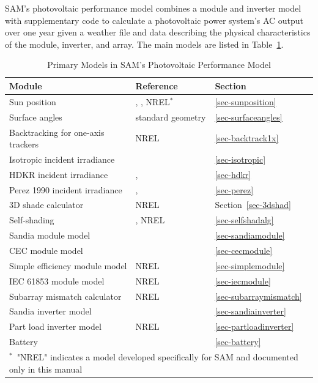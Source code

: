 \documentclass[12pt,letterpaper]{article}
\begin{document}
SAM's photovoltaic performance model combines a module and inverter model with supplementary code to calculate a photovoltaic power system's AC output over one year given a weather file and data describing the physical characteristics of the module, inverter, and array. The main models are listed in Table~\ref{tab-submodels}.

\begin{table}
\begin{center}
\caption{Primary Models in SAM's Photovoltaic Performance Model}
\begin{tabular}{lll}
\midrule
Module & Reference & Section\\
\midrule
Sun position & \citet{michalsky1988}, \citet{iqbal1983}, NREL$^*$ & \ref{sec-sunposition}\\
Surface angles & standard geometry & \ref{sec-surfaceangles}\\
Backtracking for one-axis trackers & NREL & \ref{sec-backtrack1x}\\
Isotropic incident irradiance & \citet{liu1963} & \ref{sec-isotropic}\\
HDKR incident irradiance & \citet{duffie2013}, \citet{reindl1988} & \ref{sec-hdkr}\\
Perez 1990 incident irradiance & \citet{perez1988}, \citet{perez1990} & \ref{sec-perez}\\
3D shade calculator & NREL & Section~\ref{sec-3dshad}\\
Self-shading & \citet{deline2013a}, NREL & \ref{sec-selfshadalg}\\
Sandia module model & \citet{king2004} & \ref{sec-sandiamodule}\\
CEC module model & \citet{desoto2004a} & \ref{sec-cecmodule}\\
Simple efficiency module model & NREL & \ref{sec-simplemodule}\\
IEC 61853 module model & NREL & \ref{sec-iecmodule}\\
Subarray mismatch calculator & NREL & \ref{sec-subarraymismatch} \\
Sandia inverter model & \citet{king2007} & \ref{sec-sandiainverter}\\
Part load inverter model & NREL & \ref{sec-partloadinverter}\\
Battery & \citet{diorio2015a} & \ref{sec-battery}\\
\midrule
\multicolumn{3}{l}{$^\ast$~"NREL" indicates a model developed specifically for SAM and documented only in this manual}\\
\end{tabular}
\label{tab-submodels}
\end{center}
\end{table}
\end{document}
